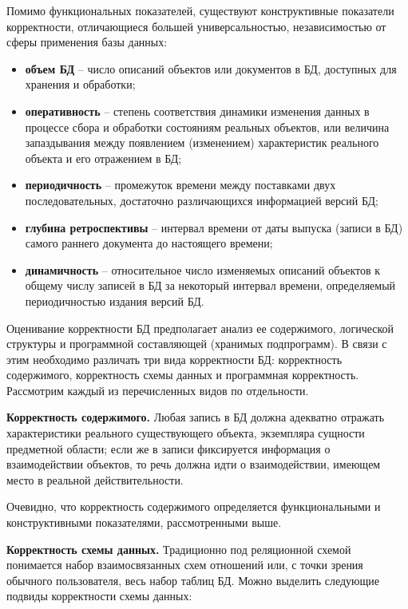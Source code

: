 Помимо функциональных показателей, существуют конструктивные показатели корректности, отличающиеся большей
универсальностью, независимостью от сферы применения базы данных:
\begin{itemize}
    \item \textbf{объем БД} – число описаний объектов или документов в БД, доступных для хранения и обработки;

    \item \textbf{оперативность} – степень соответствия динамики изменения данных в процессе сбора и обработки
    состояниям реальных объектов, или величина запаздывания между появлением (изменением) характеристик
    реального объекта и его отражением в БД;

    \item \textbf{периодичность} – промежуток времени между поставками двух последовательных, достаточно
    различающихся информацией версий БД;

    \item \textbf{глубина ретроспективы} – интервал времени от даты выпуска (записи в БД) самого раннего
    документа до настоящего времени;

    \item \textbf{динамичность} – относительное число изменяемых описаний объектов к общему числу записей в
    БД за некоторый интервал времени, определяемый периодичностью издания версий БД.
\end{itemize}

Оценивание корректности БД предполагает анализ ее содержимого, логической структуры и программной составляющей
(хранимых подпрограмм). В связи с этим необходимо различать три вида корректности БД: корректность содержимого,
корректность схемы данных и программная корректность. Рассмотрим каждый из перечисленных видов по отдельности.

\textbf{Корректность содержимого.} Любая запись в БД должна адекватно отражать характеристики реального
существующего объекта, экземпляра сущности предметной области; если же в записи фиксируется информация
о взаимодействии объектов, то речь должна идти о взаимодействии, имеющем место в реальной действительности.

Очевидно, что корректность содержимого определяется функциональными и конструктивными показателями,
рассмотренными выше.

\textbf{Корректность схемы данных.} Традиционно под реляционной схемой понимается набор взаимосвязанных схем
отношений или, с точки зрения обычного пользователя, весь набор таблиц БД. Можно выделить следующие подвиды
корректности схемы данных:

